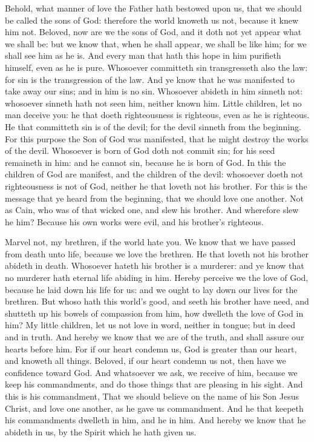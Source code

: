  Behold, what manner of love the Father hath bestowed upon
us, that we should be called the sons of God: therefore the world
knoweth us not, because it knew him not.  Beloved, now are
we the sons of God, and it doth not yet appear what we shall be: but we
know that, when he shall appear, we shall be like him; for we shall see
him as he is.  And every man that hath this hope in him
purifieth himself, even as he is pure.  Whosoever committeth
sin transgresseth also the law: for sin is the transgression of the law.
 And ye know that he was manifested to take away our sins;
and in him is no sin.  Whosoever abideth in him sinneth not:
whosoever sinneth hath not seen him, neither known him. 
Little children, let no man deceive you: he that doeth righteousness is
righteous, even as he is righteous.  He that committeth sin
is of the devil; for the devil sinneth from the beginning. For this
purpose the Son of God was manifested, that he might destroy the works
of the devil.  Whosoever is born of God doth not commit sin;
for his seed remaineth in him: and he cannot sin, because he is born of
God.  In this the children of God are manifest, and the
children of the devil: whosoever doeth not righteousness is not of God,
neither he that loveth not his brother.  For this is the
message that ye heard from the beginning, that we should love one
another.  Not as Cain, who was of that wicked one, and slew
his brother. And wherefore slew he him? Because his own works were evil,
and his brother's righteous.

 Marvel not, my brethren, if the world hate you.
 We know that we have passed from death unto life, because
we love the brethren. He that loveth not his brother abideth in death.
 Whosoever hateth his brother is a murderer: and ye know
that no murderer hath eternal life abiding in him.  Hereby
perceive we the love of God, because he laid down his life for us: and
we ought to lay down our lives for the brethren.  But whoso
hath this world's good, and seeth his brother have need, and shutteth up
his bowels of compassion from him, how dwelleth the love of God in him?
 My little children, let us not love in word, neither in
tongue; but in deed and in truth.  And hereby we know that
we are of the truth, and shall assure our hearts before him.
 For if our heart condemn us, God is greater than our
heart, and knoweth all things.  Beloved, if our heart
condemn us not, then have we confidence toward God.  And
whatsoever we ask, we receive of him, because we keep his commandments,
and do those things that are pleasing in his sight.  And
this is his commandment, That we should believe on the name of his Son
Jesus Christ, and love one another, as he gave us commandment.
 And he that keepeth his commandments dwelleth in him, and
he in him. And hereby we know that he abideth in us, by the Spirit which
he hath given us.

